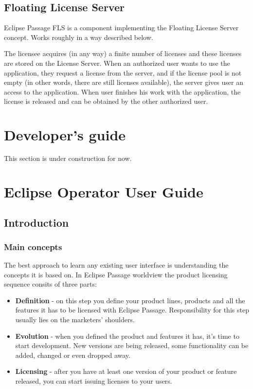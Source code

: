 \documentclass[12pt]{report}
\begin{document}
\section*{Floating License Server}

Eclipse Passage FLS is a component implementing the Floating License Server concept. Works roughly in a way described below.

The licensee acquires (in any way) a finite number of licenses and these licenses are stored on the License Server. When an authorized user wants to use the application,
they request a license from the server, and if the license pool is not empty (in other words, there are still licenses available), the server gives user an access to the
application. When user finishes his work with the application, the license is released and can be obtained by the other authorized user.

\chapter*{Developer's guide}

This section is under construction for now.

\chapter*{Eclipse Operator User Guide}

\section*{Introduction}

\subsection*{Main concepts}

The best approach to learn any existing user interface is understanding the concepts it is based on. In Eclipse Passage worldview the product licensing sequence consits of three parts:

\begin{itemize}
    \item \textbf{Definition} - on this step you define your product lines, products and all the features it has to be licensed with Eclipse Passage. Responsibility for this step usually lies on the marketers' shoulders.
    \item \textbf{Evolution} - when you defined the product and features it has, it's time to start development. New versions are being released, some functionality can be added, changed or even dropped away.
    \item \textbf{Licensing} - after you have at least one version of your product or feature released, you can start issuing licenses to your users.
\end{itemize}
\end{document}
